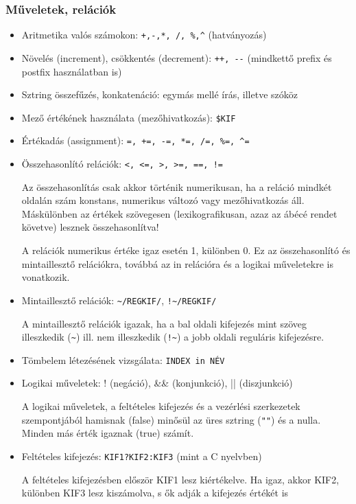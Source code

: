 \subsubsection*{Műveletek, relációk}
	\begin{itemize}
	\item  Aritmetika valós számokon: \verb.+,-,*, /, %,^. (hatványozás)
	\item  Növelés (increment), csökkentés (decrement): \verb.++, --. (mindkettő prefix
	és postfix használatban is)
	\item  Sztring összefűzés, konkatenáció: egymás mellé írás, illetve szóköz
	\item  Mező értékének használata (mezőhivatkozás): \verb.$KIF.
	\item  Értékadás (assignment): \verb.=, +=, -=, *=, /=, %=, ^=.
	\item  Összehasonlító relációk: \verb.<, <=, >, >=, ==, !=.
	
	Az összehasonlítás csak akkor történik numerikusan, ha a reláció mindkét
	oldalán szám konstans, numerikus változó vagy mezőhivatkozás áll.
	Máskülönben az értékek szövegesen (lexikografikusan, azaz az ábécé rendet követve) lesznek összehasonlítva!
	
	A relációk numerikus értéke igaz esetén 1, különben 0. Ez az
	összehasonlító és mintaillesztő relációkra, továbbá az in relációra és a
	logikai műveletekre is vonatkozik.
	\item  Mintaillesztő relációk: \verb.~/REGKIF/., \verb.!~/REGKIF/.
	
	A mintaillesztő relációk igazak, ha a bal oldali kifejezés mint szöveg
	illeszkedik (\verb.~.) ill. nem illeszkedik (\verb.!~.) a jobb oldali reguláris kifejezésre.
	\item  Tömbelem létezésének vizsgálata: \verb.INDEX in NÉV.
	\item Logikai műveletek: ! (negáció), \&\& (konjunkció), || (diszjunkció)
	
	A logikai műveletek, a feltételes kifejezés és a vezérlési szerkezetek
	szempontjából hamisnak (false) minősül az üres sztring (\verb."".) és a nulla.
	Minden más érték igaznak (true) számít.
	\item  Feltételes kifejezés: \verb.KIF1?KIF2:KIF3. (mint a C  nyelvben)
	
	A feltételes kifejezésben először KIF1 lesz kiértékelve. Ha igaz, akkor
	KIF2, különben KIF3 lesz kiszámolva, s ők adják a kifejezés értékét is
	
	\end{itemize}
	
